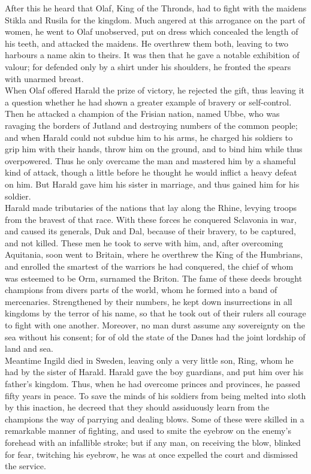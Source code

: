 \documentclass[10pt,a4paper]{report}
\begin{document}
After this he heard that Olaf, King of the Thronds, had to fight with the maidens Stikla and Rusila for the kingdom. Much angered at this arrogance on the part of women, he went to Olaf unobserved, put on dress which concealed the length of his teeth, and attacked the maidens. He overthrew them both, leaving to two harbours a name akin to theirs. It was then that he gave a notable exhibition of valour; for defended only by a shirt under his shoulders, he fronted the spears with unarmed breast.\\

When Olaf offered Harald the prize of victory, he rejected the gift, thus leaving it a question whether he had shown a greater example of bravery or self-control. Then he attacked a champion of the Frisian nation, named Ubbe, who was ravaging the borders of Jutland and destroying numbers of the common people; and when Harald could not subdue him to his arms, he charged his soldiers to grip him with their hands, throw him on the ground, and to bind him while thus overpowered. Thus he only overcame the man and mastered him by a shameful kind of attack, though a little before he thought he would inflict a heavy defeat on him. But Harald gave him his sister in marriage, and thus gained him for his soldier.\\

Harald made tributaries of the nations that lay along the Rhine, levying troops from the bravest of that race. With these forces he conquered Sclavonia in war, and caused its generals, Duk and Dal, because of their bravery, to be captured, and not killed. These men he took to serve with him, and, after overcoming Aquitania, soon went to Britain, where he overthrew the King of the Humbrians, and enrolled the smartest of the warriors he had conquered, the chief of whom was esteemed to be Orm, surnamed the Briton. The fame of these deeds brought champions from divers parts of the world, whom he formed into a band of mercenaries. Strengthened by their numbers, he kept down insurrections in all kingdoms by the terror of his name, so that he took out of their rulers all courage to fight with one another. Moreover, no man durst assume any sovereignty on the sea without his consent; for of old the state of the Danes had the joint lordship of land and sea.\\

Meantime Ingild died in Sweden, leaving only a very little son, Ring, whom he had by the sister of Harald. Harald gave the boy guardians, and put him over his father's kingdom. Thus, when he had overcome princes and provinces, he passed fifty years in peace. To save the minds of his soldiers from being melted into sloth by this inaction, he decreed that they should assiduously learn from the champions the way of parrying and dealing blows. Some of these were skilled in a remarkable manner of fighting, and used to smite the eyebrow on the enemy's forehead with an infallible stroke; but if any man, on receiving the blow, blinked for fear, twitching his eyebrow, he was at once expelled the court and dismissed the service.\\
\end{document}
